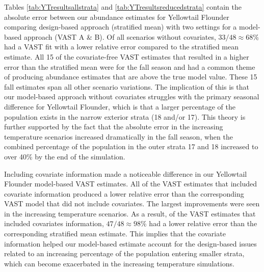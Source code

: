 \documentclass[
  12pt,
]{article}
\begin{document}
Tables \ref{tab:YTresultsallstrata} and \ref{tab:YTresultsreducedstrata} contain the absolute error between our abundance estimates for Yellowtail Flounder comparing design-based approach (stratified mean) with two settings for a model-based approach (VAST A \& B). Of all scenarios without covariates, \(33/48\approx68\)\% had a VAST fit with a lower relative error compared to the stratified mean estimate. All 15 of the covariate-free VAST estimates that resulted in a higher error than the stratified mean were for the fall season and had a common theme of producing abundance estimates that are above the true model value. These 15 fall estimates span all other scenario variations. The implication of this is that our model-based approach without covariates struggles with the primary seasonal difference for Yellowtail Flounder, which is that a larger percentage of the population exists in the narrow exterior strata (18 and/or 17). This theory is further supported by the fact that the absolute error in the increasing temperature scenarios increased dramatically in the fall season, when the combined percentage of the population in the outer strata 17 and 18 increased to over 40\% by the end of the simulation.

Including covariate information made a noticeable difference in our Yellowtail Flounder model-based VAST estimates. All of the VAST estimates that included covariate information produced a lower relative error than the corresponding VAST model that did not include covariates. The largest improvements were seen in the increasing temperature scenarios. As a result, of the VAST estimates that included covariates information, \(47/48\approx98\)\% had a lower relative error than the corresponding stratified mean estimate. This implies that the covariate information helped our model-based estimate account for the design-based issues related to an increasing percentage of the population entering smaller strata, which can become exacerbated in the increasing temperature simulations.
\end{document}
